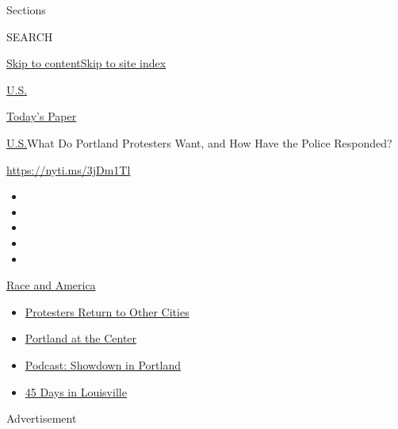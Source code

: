 Sections

SEARCH

\protect\hyperlink{site-content}{Skip to
content}\protect\hyperlink{site-index}{Skip to site index}

\href{https://www.nytimes.com/section/us}{U.S.}

\href{https://myaccount.nytimes.com/auth/login?response_type=cookie\&client_id=vi}{}

\href{https://www.nytimes.com/section/todayspaper}{Today's Paper}

\href{/section/us}{U.S.}\textbar{}What Do Portland Protesters Want, and
How Have the Police Responded?

\url{https://nyti.ms/3jDm1Tl}

\begin{itemize}
\item
\item
\item
\item
\item
\end{itemize}

\href{https://www.nytimes.com/news-event/george-floyd-protests-minneapolis-new-york-los-angeles?action=click\&pgtype=Article\&state=default\&region=TOP_BANNER\&context=storylines_menu}{Race
and America}

\begin{itemize}
\tightlist
\item
  \href{https://www.nytimes.com/2020/07/26/us/protests-portland-seattle-trump.html?action=click\&pgtype=Article\&state=default\&region=TOP_BANNER\&context=storylines_menu}{Protesters
  Return to Other Cities}
\item
  \href{https://www.nytimes.com/2020/07/24/us/portland-oregon-protests-white-race.html?action=click\&pgtype=Article\&state=default\&region=TOP_BANNER\&context=storylines_menu}{Portland
  at the Center}
\item
  \href{https://www.nytimes.com/2020/07/23/podcasts/the-daily/portland-protests.html?action=click\&pgtype=Article\&state=default\&region=TOP_BANNER\&context=storylines_menu}{Podcast:
  Showdown in Portland}
\item
  \href{https://www.nytimes.com/interactive/2020/07/16/us/black-lives-matter-protests-louisville-breonna-taylor.html?action=click\&pgtype=Article\&state=default\&region=TOP_BANNER\&context=storylines_menu}{45
  Days in Louisville}
\end{itemize}

Advertisement

